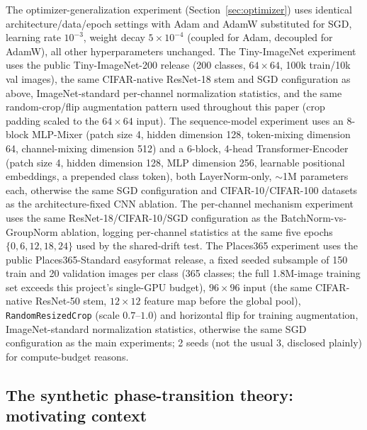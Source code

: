 The optimizer-generalization experiment (Section~\ref{sec:optimizer}) uses
identical architecture/data/epoch settings with Adam and AdamW substituted
for SGD, learning rate $10^{-3}$, weight decay $5\times10^{-4}$ (coupled for
Adam, decoupled for AdamW), all other hyperparameters unchanged. The
Tiny-ImageNet experiment uses the public Tiny-ImageNet-200 release (200
classes, $64\times64$, 100k train/10k val images), the same CIFAR-native
ResNet-18 stem and SGD configuration as above, ImageNet-standard
per-channel normalization statistics, and the same random-crop/flip
augmentation pattern used throughout this paper (crop padding scaled to
the $64\times64$ input). The sequence-model experiment uses an 8-block
MLP-Mixer (patch size 4, hidden dimension 128, token-mixing dimension 64,
channel-mixing dimension 512) and a 6-block, 4-head Transformer-Encoder
(patch size 4, hidden dimension 128, MLP dimension 256, learnable
positional embeddings, a prepended class token), both LayerNorm-only,
$\sim$1M parameters each, otherwise the same SGD configuration and
CIFAR-10/CIFAR-100 datasets as the architecture-fixed CNN ablation. The
per-channel mechanism experiment uses the same ResNet-18/CIFAR-10/SGD
configuration as the BatchNorm-vs-GroupNorm ablation, logging per-channel
statistics at the same five epochs $\{0,6,12,18,24\}$ used by the
shared-drift test. The Places365 experiment uses the public
Places365-Standard easyformat release, a fixed seeded subsample of 150
train and 20 validation images per class (365 classes; the full
1.8M-image training set exceeds this project's single-GPU budget),
$96\times96$ input (the same CIFAR-native ResNet-50 stem, $12\times12$
feature map before the global pool), \texttt{RandomResizedCrop} (scale
$0.7$--$1.0$) and horizontal flip for training augmentation,
ImageNet-standard normalization statistics, otherwise the same SGD
configuration as the main experiments; 2 seeds (not the usual 3, disclosed
plainly) for compute-budget reasons.

\subsection{The synthetic phase-transition theory: motivating context}
\label{app:synthetic}

